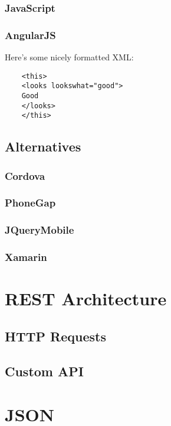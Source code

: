 \subsubsection{JavaScript}

\subsubsection{AngularJS}
Here's some nicely formatted XML:
\begin{verbatim}
	<this>
	<looks lookswhat="good">
	Good
	</looks>
	</this>
\end{verbatim}

\subsection{Alternatives}
\subsubsection{Cordova}

\subsubsection{PhoneGap}

\subsubsection{JQueryMobile}

\subsubsection{Xamarin}

\section{REST Architecture}	%
\subsection{HTTP Requests}
\subsection{Custom API}

\section{JSON}	%

